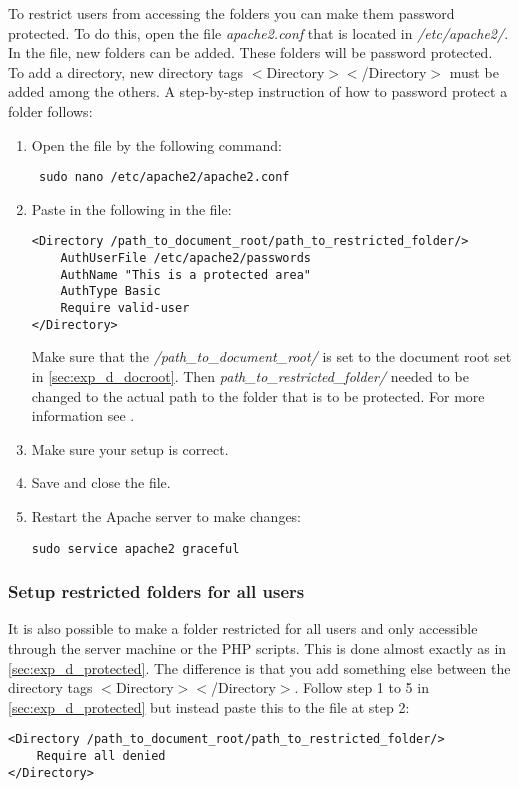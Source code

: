 To restrict users from accessing the folders you can make them password protected. To do this, open the file 
\textit{apache2.conf} that is located in \textit{/etc/apache2/}. In the file, new folders can be added. 
These folders will be password protected. To add a directory, new directory tags 
$<$Directory$><$/Directory$>$ must be added among the others.
A step-by-step instruction of how to password protect a folder follows:
\begin{enumerate}
	\item Open the file by the following command:
    \begin{verbatim} sudo nano /etc/apache2/apache2.conf\end{verbatim}
    \item Paste in the following in the file:
\begin{verbatim}
<Directory /path_to_document_root/path_to_restricted_folder/>
    AuthUserFile /etc/apache2/passwords
    AuthName "This is a protected area"
    AuthType Basic
   	Require valid-user
</Directory>
\end{verbatim}
Make sure that the \textit{/path\_to\_document\_root/} is set to the document root set in \ref{sec:exp_d_docroot}. Then \textit{path\_to\_restricted\_folder/} needed to be changed to the actual path to the folder that is to be protected. For more information see \cite{exp_apache2user}.
	\item Make sure your setup is correct.
    \item Save and close the file.
    \item Restart the Apache server to make changes:
    \begin{verbatim}sudo service apache2 graceful\end{verbatim}    
\end{enumerate}

\subsubsection{Setup restricted folders for all users}\label{sec:exp_d_restricted}
It is also possible to make a folder restricted for all users and only accessible through the server machine or the PHP scripts. This is done almost exactly as in \ref{sec:exp_d_protected}. The difference is that you add something else between the directory tags $<$Directory$><$/Directory$>$. Follow step 1 to 5 in \ref{sec:exp_d_protected} but instead paste this to the file at step 2:
\begin{verbatim}
<Directory /path_to_document_root/path_to_restricted_folder/>
    Require all denied
</Directory>
\end{verbatim}


